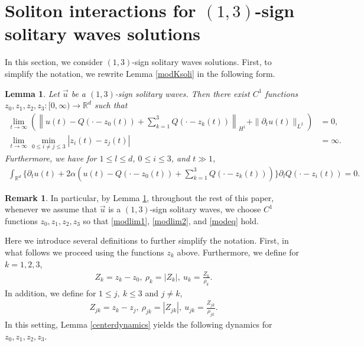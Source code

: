 \documentclass[reqno]{amsart}
\theoremstyle{plain}
\newtheorem{lemma}[theorem]{Lemma}
\theoremstyle{definition}
\newtheorem{remark}{Remark}[section]
\numberwithin{equation}{section}
\newcommand{\1}{\mathbbm{1}}
\begin{document}
\section{Soliton interactions for $(1,3)$-sign solitary waves solutions}
In this section, we consider $(1,3)$-sign solitary waves solutions. First, to simplify the notation, we rewrite Lemma \ref{modKsoli} in the following form.
\begin{lemma}\label{Ksolikakikae}
Let $\vec{u}$ be a $(1,3)$-sign solitary waves. Then there exist $C^1$ functions $z_0,z_1,z_2,z_3:[0,\infty)\to \mathbb{R}^d$ such that 
\begin{align}
\lim_{t\to\infty}(\left\| u(t)-Q(\cdot-z_0(t))+\sum_{k=1}^3 Q(\cdot-z_k(t))\right\|_{H^1}+\|{\partial}_tu(t)\|_{L^2})&=0,\label{modlim1}
\\
\lim_{t\to\infty} \min_{0\leq i\neq j\leq 3}|z_i(t)-z_j(t)|&=\infty. \label{modlim2}
\end{align}
Furthermore, we have for $1\leq l\leq d$, $0\leq i\leq 3$, and $t\gg 1$,
\begin{align}\label{modeq}
\int_{\mathbb{R}^d} \{ {\partial}_tu(t)+2\alpha(u(t)-Q(\cdot-z_0(t))+\sum_{k=1}^3 Q(\cdot-z_k(t)))\} {\partial}_lQ(\cdot-z_i(t))=0.
\end{align}
\end{lemma}
\begin{remark}
In particular, by Lemma \ref{Ksolikakikae}, throughout the rest of this paper, whenever we assume that $\vec{u}$ is a $(1,3)$-sign solitary waves, we choose $C^1$ functions $z_0,z_1,z_2,z_3$ so that \eqref{modlim1}, \eqref{modlim2}, and \eqref{modeq} hold.
\end{remark}
Here we introduce several definitions to further simplify the notation. First, in what follows we proceed using the functions $z_k$ above. Furthermore, we define for $k=1,2,3$, 
\begin{align}\label{Zrhoudef1}
Z_k=z_k-z_0,\ \rho_k=|Z_k|,\ u_k=\frac{Z_k}{\rho_k}.
\end{align}
In addition, we define for $1\leq j,\ k\leq 3$ and $j\neq k$,
\begin{align}\label{Zrhoudef2}
Z_{jk}=z_k-z_j,\ \rho_{jk}=|Z_{jk}|,\ u_{jk}=\frac{Z_{jk}}{\rho_{jk}}.
\end{align}
In this setting, Lemma \ref{centerdynamics} yields the following dynamics for $z_0,z_1,z_2,z_3$.
\end{document}
